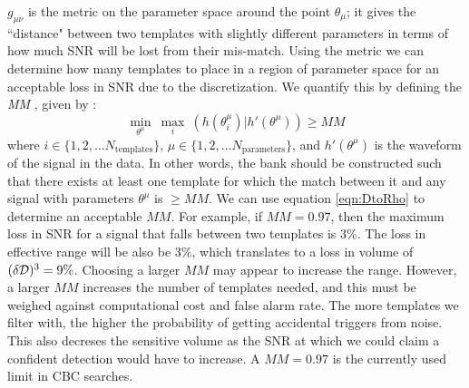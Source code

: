 $g_{\mu\nu}$ is the metric on the parameter space around the point $\theta_\mu$; it gives the ``distance" between two templates with slightly different parameters in terms of how much \ac{SNR} will be lost from their mis-match. Using the metric we can determine how many templates to place in a region of parameter space for an acceptable loss in \ac{SNR} due to the discretization. We quantify this by defining the \emph{\ac{MM}} \cite{ref:Owen:1996}, given by \cite{ref:Cokelaer:2007}:
\begin{equation}
\label{eqn:min_match}
\underset{\theta^\mu}{\min}~\underset{i}{\max}~(h(\theta^{\mu}_{i})|h'(\theta^{\mu})) \geq MM
\end{equation}
where $i \in \{ 1, 2, \ldots N_{\mathrm{templates}} \}$, $\mu \in \{ 1, 2, \ldots N_{\mathrm{parameters}} \}$, and $h'(\theta^{\mu})$ is the waveform of the signal in the data. In other words, the bank should be constructed such that there exists at least one template for which the match between it and any signal with parameters $\theta^\mu$ is $\geq MM$. We can use equation \ref{eqn:DtoRho} to determine an acceptable $MM$. For example, if $MM = 0.97$, then the maximum loss in \ac{SNR} for a signal that falls between two templates is $3\%$. The loss in effective range will be also be $3\%$, which translates to a loss in volume of $(\delta \mathcal{D})^3 = 9\%$. Choosing a larger $MM$ may appear to increase the range. However, a larger $MM$ increases the number of templates needed, and this must be weighed against computational cost and false alarm rate. The more templates we filter with, the higher the probability of getting accidental triggers from noise. This also decreses the sensitive volume as the \ac{SNR} at which we could claim a confident detection would have to increase. A $MM = 0.97$ is the currently used limit in \ac{CBC} searches.

